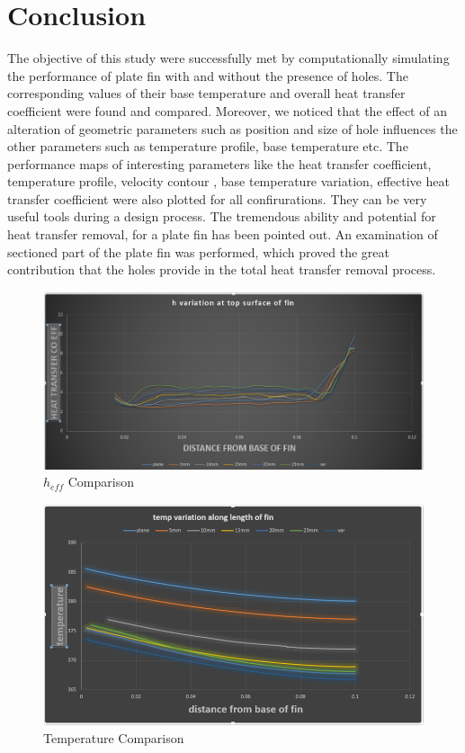 \chapter{Conclusion}
The objective of this study were successfully met by computationally simulating the performance of plate fin with and without the presence of holes. The corresponding values of their base temperature and overall heat transfer coefficient were found and compared. Moreover, we noticed that the effect of an alteration of geometric parameters such as position and size of hole influences the other parameters such as temperature profile, base temperature etc.
The performance maps of interesting parameters like the heat transfer coefficient, temperature profile, velocity contour , base temperature variation, effective heat transfer coefficient were also plotted for all confirurations. They can be very useful tools during a design process. The tremendous ability and potential for heat transfer removal, for a plate fin has been pointed out.
An examination of sectioned part of the plate fin was performed, which proved the great contribution that the holes provide in the total heat transfer removal process.

\begin{figure}[h]
	\label{ss}    %
	\centering
	\includegraphics[width= 11 cm]{119.png}
	\caption{$h_{eff}$ Comparison}
\end{figure}

\begin{figure}[h]
	\label{ss}    %
	\centering
	\includegraphics[width= 11 cm]{120.png}
	\caption{Temperature Comparison}
\end{figure}

